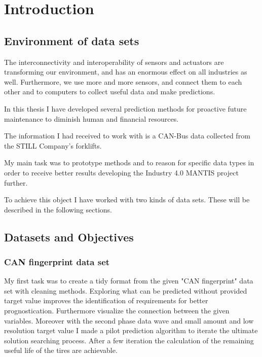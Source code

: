 \chapter*{Introduction}
\setcounter{chapter}{1}
\section{Environment of data sets}
The interconnectivity and interoperability \cite{TalebArchInsSys} of sensors and actuators are transforming our environment, and has an enormous effect on all industries as well. Furthermore, we use more and more sensors, and connect them to each other and to computers to collect useful data and make predictions.

In this thesis I have developed several prediction methods for proactive future maintenance to diminish human and financial resources.

The information I had received to work with is a CAN-Bus data collected from the STILL Company's forklifts.

My main task was to prototype methods and to reason for specific data types in order to receive better results developing the Industry 4.0 \cite{Indfourpointzero} MANTIS project further. \cite{PaliHCsCPS,HCsCPS2,GartnerIoT,HuangCPS,PaliCPS,HCsCPS,ProMain}

To achieve this object I have worked with two kinds of data sets. These will be described in the following sections.
\section{Datasets and Objectives}
    \subsection{CAN fingerprint data set}
\noindent
My first task was to create a tidy format from the given "CAN fingerprint" data set with cleaning methods. Exploring what can be predicted without provided target value improves the identification of requirements for better prognostication. Furthermore visualize the connection between the given variables. Moreover with the second phase data wave and small amount and low resolution target value I made a pilot prediction algorithm to iterate the ultimate solution searching process. 
\noindent
After a few iteration the calculation of the remaining useful life of the tires are achievable. 
